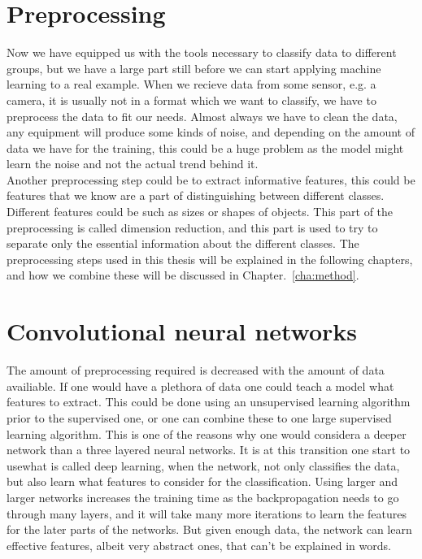 
\section{Preprocessing}

Now we have equipped us with the tools necessary to classify data to different groups, but we have a large part still before we can start applying machine learning to a real example. When we recieve data from some sensor, e.g. a camera, it is usually not in a format which we want to classify, we have to preprocess the data to fit our needs. Almost always we have to clean the data, any equipment will produce some kinds of noise, and depending on the amount of data we have for the training, this could be a huge problem as the model might learn the noise and not the actual trend behind it.\\

Another preprocessing step could be to extract informative features, this could be features that we know are a part of distinguishing between different classes. Different features could be such as sizes or shapes of objects. This part of the preprocessing is called dimension reduction, and this part is used to try to separate only the essential information about the different classes. The preprocessing steps used in this thesis will be explained in the following chapters, and how we combine these will be discussed in Chapter.~\ref{cha:method}.

\section{Convolutional neural networks}

The amount of preprocessing required is decreased with the amount of data availiable. If one would have a plethora of data one could teach a model what features to extract. This could be done using an unsupervised learning algorithm prior to the supervised one, or one can combine these to one large supervised learning algorithm. This is one of the reasons why one would considera a deeper network than a three layered neural networks. It is at this transition one start to usewhat is called deep learning, when the network, not only classifies the data, but also learn what features to consider for the classification. Using larger and larger networks increases the training time as the backpropagation needs to go through many layers, and it will take many more iterations to learn the features for the later parts of the networks. But given enough data, the network can learn effective features, albeit very abstract ones, that can't be explained in words.\\

